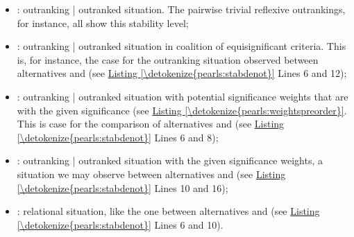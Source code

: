 \documentclass[a4paper,12pt,english]{sphinxhowto}
\begin{document}
\sphinxresetverbatimhllines
\begin{description}
\begin{itemize}
\item {} 
\sphinxAtStartPar
{} :  outranking | outranked situation. The pairwise trivial reflexive outrankings, for instance, all show this stability level;

\item {} 
\sphinxAtStartPar
{} :  outranking | outranked situation in  coalition of equisignificant criteria. This is, for instance, the case for the outranking situation observed between alternatives  and  (see \hyperref[\detokenize{pearls:stabdenot}]{Listing \ref{\detokenize{pearls:stabdenot}}} Lines 6 and 12);

\item {} 
\sphinxAtStartPar
{} : outranking | outranked situation  with  potential significance weights that are  with the given significance  (see \hyperref[\detokenize{pearls:weightspreorder}]{Listing \ref{\detokenize{pearls:weightspreorder}}}. This is case for the comparison of alternatives  and   (see \hyperref[\detokenize{pearls:stabdenot}]{Listing \ref{\detokenize{pearls:stabdenot}}} Lines 6 and 8);

\item {} 
\sphinxAtStartPar
{} :  outranking | outranked situation with the given significance weights, a situation we may observe between alternatives  and  (see \hyperref[\detokenize{pearls:stabdenot}]{Listing \ref{\detokenize{pearls:stabdenot}}} Lines 10 and 16);

\item {} 
\sphinxAtStartPar
{} :  relational situation, like the one between alternatives  and  (see \hyperref[\detokenize{pearls:stabdenot}]{Listing \ref{\detokenize{pearls:stabdenot}}} Lines 6 and 10).

\end{itemize}

\end{description}
\end{document}
